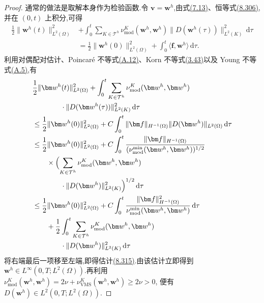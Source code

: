 \begin{proof}
通常的做法是取解本身作为检验函数.令 $\bm v=\bm w^h$,由式\hyperref[eq:time-dependent-galerkin-product-rule]{(7.13)}、恒等式\hyperref[eq:vms-coarse-projection-local-viscosity]{(8.306)},并在 $(0,t)$ 上积分,可得
\[
\begin{aligned}
 \frac12\|\bm w^h(t)\|_{L^2(\Omega)}^2
 &+\int_0^t\sum_{K\in\mathcal T^h}
   \nu_{\mathrm{mod}}^K(\bm w^h,\bm w^h)
   \|D(\bm w^h(\tau))\|_{L^2(K)}^2\,\mathrm d\tau\\
 &=\frac12\|\bm w^h(0)\|_{L^2(\Omega)}^2
   +\int_0^t\langle\bm f,\bm w^h\rangle\,\mathrm d\tau.
\end{aligned}
\]
利用对偶配对估计、Poincaré 不等式\hyperref[eq:appendix-a-12]{(A.12)}、Korn 不等式\hyperref[eq:korn-inequality-v]{(3.43)}以及 Young 不等式\hyperref[eq:appendix-a-5]{(A.5)},有
\begin{equation}\label{eq:vms-coarse-projection-stability-proof-estimate}
\begin{aligned}
 &\frac12\|\bm w^h(t)\|_{L^2(\Omega)}^2
  +\int_0^t\sum_{K\in\mathcal T^h}
    \nu_{\mathrm{mod}}^K(\bm w^h,\bm w^h)\\
 &\qquad\qquad\cdot
    \|D(\bm w^h(\tau))\|_{L^2(K)}^2\,\mathrm d\tau\\
 &\le\frac12\|\bm w^h(0)\|_{L^2(\Omega)}^2
   +C\int_0^t
       \|\bm f\|_{H^{-1}(\Omega)}
       \|D(\bm w^h)\|_{L^2(\Omega)}\,\mathrm d\tau\\
 &\le\frac12\|\bm w^h(0)\|_{L^2(\Omega)}^2
   +C\int_0^t
       \frac{\|\bm f\|_{H^{-1}(\Omega)}}
            {(\nu_{\mathrm{mod}}^{\min}(\bm w^h,\bm w^h))^{1/2}}\\
 &\qquad\times\Bigl(
        \sum_{K\in\mathcal T^h}
          \nu_{\mathrm{mod}}^K(\bm w^h,\bm w^h)\\
 &\qquad\qquad\cdot
          \|D(\bm w^h)\|_{L^2(K)}^2
       \Bigr)^{1/2}\,\mathrm d\tau\\
 &\le\frac12\|\bm w^h(0)\|_{L^2(\Omega)}^2
   +C\int_0^t
       \frac{\|\bm f\|_{H^{-1}(\Omega)}^2}
            {\nu_{\mathrm{mod}}^{\min}(\bm w^h,\bm w^h)}\,\mathrm d\tau\\
 &\qquad+\frac12\int_0^t\sum_{K\in\mathcal T^h}
       \nu_{\mathrm{mod}}^K(\bm w^h,\bm w^h)\\
 &\qquad\qquad\cdot
       \|D(\bm w^h)\|_{L^2(K)}^2\,\mathrm d\tau
\end{aligned}
\end{equation}
将右端最后一项移至左端,即得估计\hyperref[eq:vms-coarse-projection-stability-estimate]{(8.315)}.由该估计立即得到
$\bm w^h\in L^\infty(0,T;L^2(\Omega))$.再利用
$\nu_{\mathrm{mod}}^K(\bm w^h,\bm w^h)
=2\nu+\nu_{\mathrm{VMS}}^K(\bm w^h,\bm w^h)\ge2\nu>0$,
便有 $D(\bm w^h)\in L^2(0,T;L^2(\Omega))$.
\end{proof}

